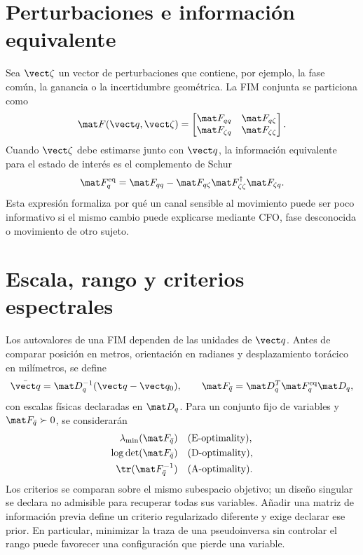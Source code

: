 \section{Perturbaciones e información equivalente}

Sea $\vect\zeta$ un vector de perturbaciones que contiene, por ejemplo, la fase común, la ganancia o la incertidumbre geométrica. La FIM conjunta se particiona como
\begin{equation}
\mat F(\vect q,\vect\zeta)=
\begin{bmatrix}
\mat F_{qq}&\mat F_{q\zeta}\\
\mat F_{\zeta q}&\mat F_{\zeta\zeta}
\end{bmatrix}.
\end{equation}
Cuando $\vect\zeta$ debe estimarse junto con $\vect q$, la información equivalente para el estado de interés es el complemento de Schur
\begin{equation}
\mat F_q^{\rm eq}=
\mat F_{qq}-
\mat F_{q\zeta}\mat F_{\zeta\zeta}^{\dagger}
\mat F_{\zeta q}.
\label{eq:equivalent_fim}
\end{equation}
Esta expresión formaliza por qué un canal sensible al movimiento puede ser poco informativo si el mismo cambio puede explicarse mediante CFO, fase desconocida o movimiento de otro sujeto.

\section{Escala, rango y criterios espectrales}

Los autovalores de una FIM dependen de las unidades de $\vect q$. Antes de comparar posición en metros, orientación en radianes y desplazamiento torácico en milímetros, se define
\begin{equation}
\bar{\vect q}=\mat D_q^{-1}(\vect q-\vect q_0),
\qquad
\mat F_{\bar q}=\mat D_q^T\mat F_q^{\rm eq}\mat D_q,
\label{eq:fim_normalization}
\end{equation}
con escalas físicas declaradas en $\mat D_q$. Para un conjunto fijo de variables
y $\mat F_{\bar q}\succ0$, se considerarán
\begin{align}
\lambda_{\min}(\mat F_{\bar q})
&\quad\text{(E-optimality)},\\
\log\det(\mat F_{\bar q})
&\quad\text{(D-optimality)},\\
\tr(\mat F_{\bar q}^{-1})
&\quad\text{(A-optimality)}.
\end{align}
Los criterios se comparan sobre el mismo subespacio objetivo; un diseño singular
se declara no admisible para recuperar todas sus variables. Añadir una matriz
de información previa define un criterio regularizado diferente y exige declarar
ese prior. En particular, minimizar la traza de una pseudoinversa sin controlar
el rango puede favorecer una configuración que pierde una variable.

